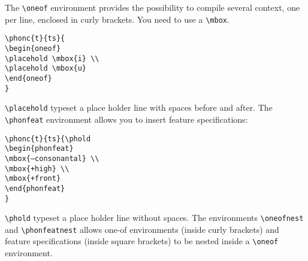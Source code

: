 \documentclass[a4paper]{article}
\begin{document}
The \verb+\oneof+ environment provides the possibility to compile several context, one per line, enclosed in curly brackets. You need to use a \verb+\mbox+.

\begin{exe}
\ex
\begin{verbatim}
\phonc{t}{ts}{
\begin{oneof}
\placehold \mbox{i} \\
\placehold \mbox{u}
\end{oneof}
}
\end{verbatim}
\ex {}
\end{exe}

\verb+\placehold+ typeset a place holder line with spaces before and after. The \verb+\phonfeat+ environment allows you to insert feature specifications:

\begin{exe}
\ex
\begin{verbatim}
\phonc{t}{ts}{\phold 
\begin{phonfeat}
\mbox{–consonantal} \\
\mbox{+high} \\
\mbox{+front}
\end{phonfeat}
}
\end{verbatim}
\ex {}
\end{exe}

\verb+\phold+ typeset a place holder line without spaces. The environments \verb+\oneofnest+ and \verb+\phonfeatnest+ allows one-of environments (inside curly brackets) and feature specifications (inside square brackets) to be nested inside a \verb+\oneof+ environment.






\end{document}
